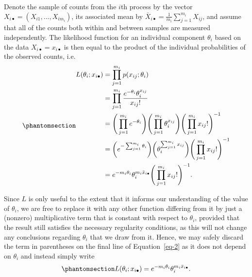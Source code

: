 \documentclass[
  12pt]{article}
\begin{document}
Denote the sample of counts from the \(i\)th process by the vector
\(X_{i\bullet} = (X_{i1}, ..., X_{im_i})\), its associated mean by
\(\bar{X}_{i \bullet} = \frac{1}{m_i} \sum_{j = 1}^{m_i} X_{ij}\), and
assume that all of the counts both within and between samples are
measured independently. The likelihood function for an individual
component \(\theta_i\) based on the data \(X_{i\bullet} = x_{i\bullet}\)
is then equal to the product of the individual probabilities of the
observed counts, i.e. \begin{equation}\phantomsection\label{eq-2}{
\begin{aligned}
L(\theta_i; x_{i\bullet}) &= \prod_{j=1}^{m_i} p(x_{ij}; \theta_i) \\
                          &= \prod_{j=1}^{m_i} \frac{e^{-\theta_i} \theta_i ^ {x_{ij}}}{x_{ij}!} \\
                          &= \Bigg(\prod_{j=1}^{m_i} e^{-\theta_i}\Bigg) \Bigg(\prod_{j=1}^{m_i}\theta_i^{x_{ij}}\Bigg) \Bigg(\prod_{j=1}^{m_i} x_{ij}!\Bigg)^{-1} \\
                          &= \bigg(e^{-\sum_{j=1}^{m_i}\theta_i}\bigg) \bigg(\theta_i^{\sum_{j=1}^{m_i}x_{ij}}\bigg) \Bigg(\prod_{j=1}^{m_i} x_{ij}!\Bigg)^{-1} \\
                          &= e^{-m_i\theta_i}\theta_i^{m_i\bar{x}_{i\bullet}}\Bigg(\prod_{j=1}^{m_i} x_{ij}!\Bigg)^{-1}.
\end{aligned}
}\end{equation}

Since \(L\) is only useful to the extent that it informs our
understanding of the value of \(\theta_i\), we are free to replace it
with any other function differing from it by just a (nonzero)
multiplicative term that is constant with respect to \(\theta_i\),
provided that the result still satisfies the necessary regularity
conditions, as this will not change any conclusions regarding
\(\theta_i\) that we draw from it. Hence, we may safely discard the term
in parentheses on the final line of Equation~\ref{eq-2} as it does not
depend on \(\theta_i\) and instead simply write
\begin{equation}\phantomsection\label{eq-3}{
L(\theta_i; x_{i\bullet}) = e^{-m_i\theta_i}\theta_i^{m_i\bar{x}_{i\bullet}}.
}\end{equation}
\end{document}
